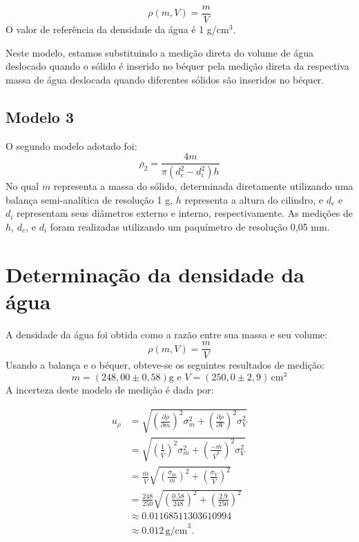 \documentclass{article}
\begin{document}
\begin{multicols*}{2}
    \begin{equation}
        \rho(m, V) = \frac{m}{V}
        \end{equation}
        O valor de referência da densidade da água é 1 g/cm\(^3\).

Neste modelo, estamos substituindo a medição direta do volume de água deslocado quando o sólido é inserido no béquer pela medição direta da respectiva massa de água deslocada quando diferentes sólidos são inseridos no béquer.

     \subsection{Modelo 3}
        O segundo modelo adotado foi:
        \begin{equation}
            \rho_2 = \frac{4m}{\pi(d_{e}^2 - d_{i}^2)h}
            \end{equation}
            No qual \(m\) representa a massa do sólido, determinada diretamente utilizando uma balança semi-analítica de resolução 1 g, \(h\) representa a altura do cilindro, e \(d_e\) e \(d_i\) representam seus diâmetros externo e interno, respectivamente. As medições de \(h\), \(d_e\), e \(d_i\) foram realizadas utilizando um paquímetro de resolução 0,05 mm.


    \section{Determinação da densidade da água}
    A densidade da água foi obtida como a razão entre sua massa e seu volume:
    \begin{equation}
    \rho(m, V) = \frac{m}{V}
    \end{equation}
    Usando a balança e o béquer, obteve-se os seguintes resultados de medição:
    \begin{equation}
        m = (248,00 \pm 0,58) \text{g e } V = (250,0 \pm 2,9) \, \text{cm}^3
    \end{equation}  A incerteza deste modelo de medição é dada por:

    \begin{align*}
        u_{\rho} &= \sqrt{\left(\frac{\partial \rho}{\partial m}\right)^2 \sigma^2_m + \left(\frac{\partial \rho}{\partial V}\right)^2 \sigma^2_V} \\
        &= \sqrt{\left(\frac{1}{\overline{V}}\right)^2 \sigma^2_m + \left(\frac{-\overline{m}}{\overline{V}^2}\right)^2 \sigma^2_V} \\
        &= \frac{\overline{m}}{\overline{V}} \sqrt{\left(\frac{\sigma_m}{\overline{m}}\right)^2 + \left(\frac{\sigma_V}{\overline{V}}\right)^2} \\
        &= \frac{248}{250} \sqrt{\left(\frac{0.58}{248}\right)^2 + \left(\frac{2.9}{250}\right)^2} \\
        &\approx 0.01168511303610994 \\
        &\approx 0.012 \, \text{g/cm}^3.
        \end{align*}
        

\end{multicols*}
\end{document}

